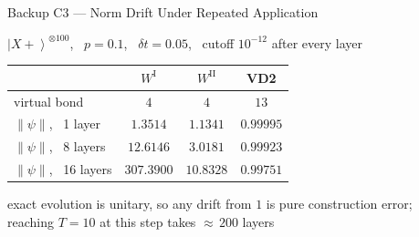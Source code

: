 \documentclass[aspectratio=169,11pt]{beamer}
\newcommand{\ket}[1]{\left|#1\right\rangle}
\begin{document}
\begin{frame}{Backup C3 --- Norm Drift Under Repeated Application}
  \begin{center}\small
    $\ket{X+}^{\otimes100}$, \ $p=0.1$, \ $\delta t=0.05$, \ cutoff $10^{-12}$
    after every layer
  \end{center}
  \begin{center}
    \setlength{\tabcolsep}{9pt}\renewcommand{\arraystretch}{1.2}
    \begin{tabular}{lccc}
      \toprule
                                      & $W^{\mathrm{I}}$ & $W^{\mathrm{II}}$ & VD2       \\
      \midrule
      virtual bond                    & $4$              & $4$               & $13$      \\
      \midrule
      $\lVert\psi\rVert$, \ 1 layer   & $1.3514$         & $1.1341$          & $0.99995$ \\
      $\lVert\psi\rVert$, \ 8 layers  & $12.6146$        & $3.0181$          & $0.99923$ \\
      $\lVert\psi\rVert$, \ 16 layers & $307.3900$       & $10.8328$         & $0.99751$ \\
      \bottomrule
    \end{tabular}
  \end{center}
  \vfill
  \begin{center}\footnotesize\color{ink!70}
    exact evolution is unitary, so any drift from $1$ is pure construction
    error;\\ reaching $T=10$ at this step takes ${\approx}\,200$ layers
  \end{center}
\end{frame}
\end{document}
